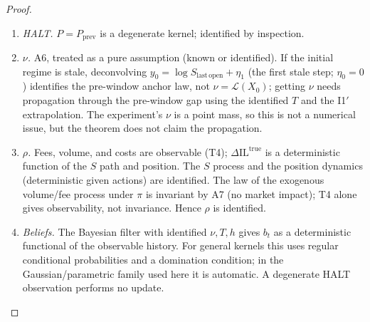 \begin{proof}
\begin{enumerate}
The block start is not stationary: a block that follows OPEN starts from
$\eta=0$ (the experiment's day-11 Friday-evening block), while a block that
follows EXTENDED carries the last EXTENDED state (the experiment's day-4
holiday block, whose initial variance follows from the identified
$(\phi_{\mathrm{ext}},\sigma_{\mathrm{ext}}^2)$ and the known block length).  In
general
\[
V_\eta(u)=\phi^{2u}V_0+\frac{\sigma^2(1-\phi^{2u})}{1-\phi^2}
\]
with $V_0$ known from the model/calendar (or identified from the $u$-profile);
the $u$-profile is over-identifying.  The cross-event decomposition (anchor law
plus bias) is a supplementary consistency check, not the identification route.
HOLIDAY uses the same stale channel with its own calendar anchor; in the
experiment the day-4 HOLIDAY, the following weekend, and Monday
00:00--08:00 form one continuous 81-hour stale block (same anchor and same
$(\phi,\sigma^2)$), so the carried start is inherited from the last EXTENDED
step.  The initial 9-hour block is zero-started by the model's initialization
and its anchor is $S_0$; its anchor law is the pre-window object discussed under
A6.
\item \emph{HALT.}  $P=P_{\mathrm{prev}}$ is a degenerate kernel; identified by
inspection.
\item \emph{$\nu$.}  A6, treated as a pure assumption (known or identified).  If
the initial regime is stale, deconvolving
$y_0=\log S_{\mathrm{last\,open}}+\eta_1$ (the first stale step; $\eta_0=0$)
identifies the pre-window anchor law, not $\nu=\mathcal L(X_0)$; getting $\nu$
needs propagation through the pre-window gap using the identified $T$ and the
I1$'$ extrapolation.  The experiment's $\nu$ is a point mass, so this is not a
numerical issue, but the theorem does not claim the propagation.
\item \emph{$\rho$.}  Fees, volume, and costs are observable (T4);
$\Delta\mathrm{IL}^{\mathrm{true}}$ is a deterministic function of the $S$ path
and position.  The $S$ process and the position dynamics (deterministic given
actions) are identified.  The law of the exogenous volume/fee process under
$\pi$ is invariant by A7 (no market impact); T4 alone gives observability, not
invariance.  Hence $\rho$ is identified.
\item \emph{Beliefs.}  The Bayesian filter with identified $\nu,T,h$ gives $b_t$
as a deterministic functional of the observable history.  For general kernels
this uses regular conditional probabilities and a domination condition; in the
Gaussian/parametric family used here it is automatic.  A degenerate HALT
observation performs no update.
\end{enumerate}


\end{proof}
